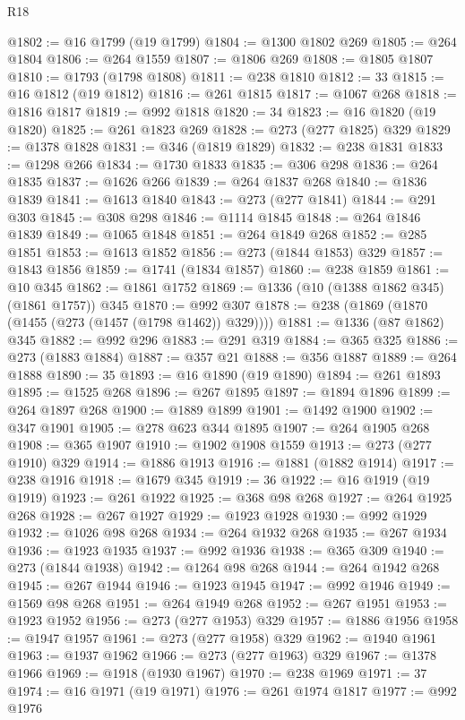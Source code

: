 \begin{lexlean}{R18}
\begin{coremodule}
{{{{{{{{{{{{{{{{{{{{{{{{{{{{{{{{{{{{{{{{{{{{{{{{{{{{{{{{{{{{{{{{{{{{{{{{{{{{{{{{{{{{{{{{{{{{{{{{{{{{{{{{{{{{{{{{{{{{{{{{{{{{{{{{{{{{{{{{{{{{{{{@1802 := @16 @1799 (@19 @1799)
@1804 := @1300 @1802 @269
@1805 := @264 @1804
@1806 := @264 @1559
@1807 := @1806 @269
@1808 := @1805 @1807
@1810 := @1793 (@1798 @1808)
@1811 := @238 @1810
@1812 := 33
@1815 := @16 @1812 (@19 @1812)
@1816 := @261 @1815
@1817 := @1067 @268
@1818 := @1816 @1817
@1819 := @992 @1818
@1820 := 34
@1823 := @16 @1820 (@19 @1820)
@1825 := @261 @1823 @269
@1828 := @273 (@277 @1825) @329
@1829 := @1378 @1828
@1831 := @346 (@1819 @1829)
@1832 := @238 @1831
@1833 := @1298 @266
@1834 := @1730 @1833
@1835 := @306 @298
@1836 := @264 @1835
@1837 := @1626 @266
@1839 := @264 @1837 @268
@1840 := @1836 @1839
@1841 := @1613 @1840
@1843 := @273 (@277 @1841)
@1844 := @291 @303
@1845 := @308 @298
@1846 := @1114 @1845
@1848 := @264 @1846 @1839
@1849 := @1065 @1848
@1851 := @264 @1849 @268
@1852 := @285 @1851
@1853 := @1613 @1852
@1856 := @273 (@1844 @1853) @329
@1857 := @1843 @1856
@1859 := @1741 (@1834 @1857)
@1860 := @238 @1859
@1861 := @10 @345
@1862 := @1861 @1752
@1869 := @1336 (@10 (@1388 @1862 @345) (@1861 @1757)) @345
@1870 := @992 @307
@1878 := @238 (@1869 (@1870 (@1455 (@273 (@1457 (@1798 @1462)) @329))))
@1881 := @1336 (@87 @1862) @345
@1882 := @992 @296
@1883 := @291 @319
@1884 := @365 @325
@1886 := @273 (@1883 @1884)
@1887 := @357 @21
@1888 := @356 @1887
@1889 := @264 @1888
@1890 := 35
@1893 := @16 @1890 (@19 @1890)
@1894 := @261 @1893
@1895 := @1525 @268
@1896 := @267 @1895
@1897 := @1894 @1896
@1899 := @264 @1897 @268
@1900 := @1889 @1899
@1901 := @1492 @1900
@1902 := @347 @1901
@1905 := @278 @623 @344 @1895
@1907 := @264 @1905 @268
@1908 := @365 @1907
@1910 := @1902 @1908 @1559
@1913 := @273 (@277 @1910) @329
@1914 := @1886 @1913
@1916 := @1881 (@1882 @1914)
@1917 := @238 @1916
@1918 := @1679 @345
@1919 := 36
@1922 := @16 @1919 (@19 @1919)
@1923 := @261 @1922
@1925 := @368 @98 @268
@1927 := @264 @1925 @268
@1928 := @267 @1927
@1929 := @1923 @1928
@1930 := @992 @1929
@1932 := @1026 @98 @268
@1934 := @264 @1932 @268
@1935 := @267 @1934
@1936 := @1923 @1935
@1937 := @992 @1936
@1938 := @365 @309
@1940 := @273 (@1844 @1938)
@1942 := @1264 @98 @268
@1944 := @264 @1942 @268
@1945 := @267 @1944
@1946 := @1923 @1945
@1947 := @992 @1946
@1949 := @1569 @98 @268
@1951 := @264 @1949 @268
@1952 := @267 @1951
@1953 := @1923 @1952
@1956 := @273 (@277 @1953) @329
@1957 := @1886 @1956
@1958 := @1947 @1957
@1961 := @273 (@277 @1958) @329
@1962 := @1940 @1961
@1963 := @1937 @1962
@1966 := @273 (@277 @1963) @329
@1967 := @1378 @1966
@1969 := @1918 (@1930 @1967)
@1970 := @238 @1969
@1971 := 37
@1974 := @16 @1971 (@19 @1971)
@1976 := @261 @1974 @1817
@1977 := @992 @1976
}}}}}}}}}}}}}}}}}}}}}}}}}}}}}}}}}}}}}}}}}}}}}}}}}}}}}}}}}}}}}}}}}}}}}}}}}}}}}}}}}}}}}}}}}}}}}}}}}}}}}}}}}}}}}}}}}}}}}}}}}}}}}}}}}}}}}}}}}}}}}}}
\end{coremodule}
\end{lexlean}
